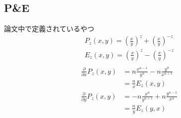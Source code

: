 \documentclass[a4paper, 11pt]{article}
\begin{document}
\color{NavyBlue}
\subsection{P\&E}
論文中で定義されているやつ
\begin{align}
    P_{z}(x,y) = \left(\frac{x}{y}\right)^z + \left(\frac{x}{y}\right)^{-z}\\
    E_{z}(x,y) = \left(\frac{x}{y}\right)^z - \left(\frac{x}{y}\right)^{-z}\\
\end{align}
\begin{align}
    \frac{\partial }{\partial x}P_{z}(x,y) & = n\frac{x^{n-1}}{y^n} - n\frac{y^n}{x^{n+1}}\\
    & = \frac{n}{x}E_z(x,y)\\
    \frac{\partial }{\partial y}P_{z}(x,y) & = -n\frac{x^n}{y^{n+1}} + n\frac{y^{n-1}}{x^{n}}\\
    & = \frac{n}{y}E_z(y,x)
\end{align}
\end{document}
